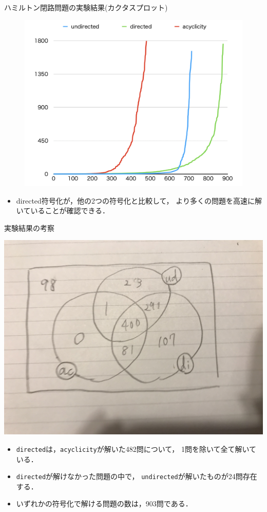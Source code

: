 \documentclass[dvipdfmx,10pt]{beamer}
\begin{document}
\begin{frame}{ハミルトン閉路問題の実験結果(カクタスプロット)}
\begin{figure}[tb]
\begin{center}
  \includegraphics[width=0.7\linewidth]{fig/cactus.png}
\label{cactus}
\end{center}
\end{figure}
\begin{itemize}
\item \textsf{directed}符号化が，他の2つの符号化と比較して，
      より多くの問題を高速に解いていることが確認できる．
\end{itemize}
\end{frame}
\begin{frame}{実験結果の考察}
\begin{center}
\includegraphics[width=0.5\linewidth]{fig/venn.jpeg}
\end{center}
\begin{itemize}
 \item \texttt{directed}は，\texttt{acyclicity}が解いた482問について，
       1問を除いて全て解いている．
 \item \texttt{directed}が解けなかった問題の中で，
       \texttt{undirected}が解いたものが24問存在する．
 \item いずれかの符号化で解ける問題の数は，903問である．
\end{itemize}
\end{frame}
\end{document}
